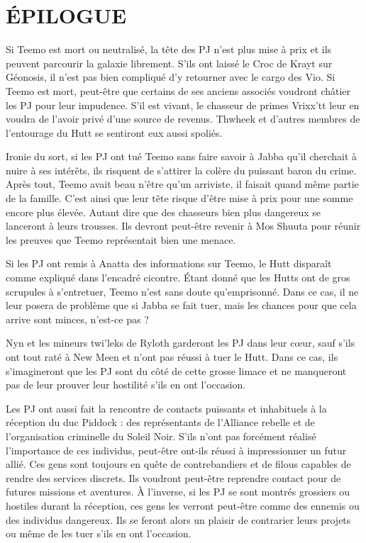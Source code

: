 \documentclass[a4paper,10pt,twoside,twocolumn,openany]{book}
\begin{document}
\section{ÉPILOGUE}

Si Teemo est mort ou neutralisé, la tête des PJ n’est
plus mise à prix et ils peuvent parcourir la galaxie librement. S’ils ont laissé le Croc de Krayt sur Géonosis,
il n’est pas bien compliqué d’y retourner avec le cargo
des Vio. Si Teemo est mort, peut-être que certains de
ses anciens associés voudront châtier les PJ pour leur
impudence. S’il est vivant, le chasseur de primes Vrixx’tt
leur en voudra de l’avoir privé d’une source de revenus.
Thwheek et d’autres membres de l’entourage du Hutt se
sentiront eux aussi spoliés.

Ironie du sort, si les PJ ont tué Teemo sans faire savoir
à Jabba qu’il cherchait à nuire à ses intérêts, ils risquent
de s’attirer la colère du puissant baron du crime. Après
tout, Teemo avait beau n’être qu’un arriviste, il faisait
quand même partie de la famille. C’est ainsi que leur tête
risque d’être mise à prix pour une somme encore plus
élevée. Autant dire que des chasseurs bien plus dangereux se lanceront à leurs trousses. Ils devront peut-être
revenir à Mos Shuuta pour réunir les preuves que Teemo
représentait bien une menace.

Si les PJ ont remis à Anatta des informations sur Teemo, le Hutt disparaît comme expliqué dans l’encadré cicontre. Étant donné que les Hutts ont de gros scrupules
à s’entretuer, Teemo n’est sans doute qu’emprisonné.
Dans ce cas, il ne leur posera de problème que si Jabba
se fait tuer, mais les chances pour que cela arrive sont
minces, n’est-ce pas ?

Nyn et les mineurs twi’leks de Ryloth garderont les PJ
dans leur cœur, sauf s’ils ont tout raté à New Meen et
n’ont pas réussi à tuer le Hutt. Dans ce cas, ils s’imagineront que les PJ sont du côté de cette grosse limace et
ne manqueront pas de leur prouver leur hostilité s’ils en
ont l’occasion.

Les PJ ont aussi fait la rencontre de contacts puissants
et inhabituels à la réception du duc Piddock : des représentants de l’Alliance rebelle et de l’organisation criminelle du Soleil Noir. S’ils n’ont pas forcément réalisé
l’importance de ces individus, peut-être ont-ils réussi à
impressionner un futur allié. Ces gens sont toujours en
quête de contrebandiers et de filous capables de rendre
des services discrets. Ils voudront peut-être reprendre
contact pour de futures missions et aventures. À l’inverse, si les PJ se sont montrés grossiers ou hostiles durant la réception, ces gens les verront peut-être comme
des ennemis ou des individus dangereux. Ils se feront
alors un plaisir de contrarier leurs projets ou même de
les tuer s’ils en ont l’occasion.

\end{document}
